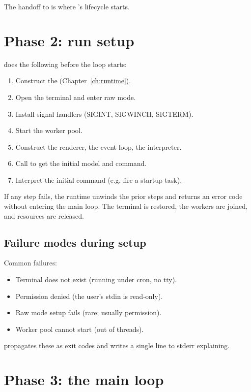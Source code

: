The handoff to  is where \maya{}'s lifecycle starts.

\section{Phase 2: run setup}

 does the following before the loop starts:

\begin{enumerate}[leftmargin=*]
  \item Construct the  (Chapter~\ref{ch:runtime}).
  \item Open the terminal and enter raw mode.
  \item Install signal handlers (SIGINT, SIGWINCH, SIGTERM).
  \item Start the worker pool.
  \item Construct the renderer, the event loop, the interpreter.
  \item Call  to get the initial model and
    command.
  \item Interpret the initial command (e.g. fire a startup
    task).
\end{enumerate}

If any step fails, the runtime unwinds the prior steps and
returns an error code without entering the main loop. The
terminal is restored, the workers are joined, and resources are
released.

\subsection*{Failure modes during setup}

Common failures:

\begin{itemize}[leftmargin=*]
  \item Terminal does not exist (running under cron, no tty).
  \item Permission denied (the user's stdin is read-only).
  \item Raw mode setup fails (rare; usually permission).
  \item Worker pool cannot start (out of threads).
\end{itemize}

\maya{} propagates these as exit codes and writes a single
line to stderr explaining.

\section{Phase 3: the main loop}

